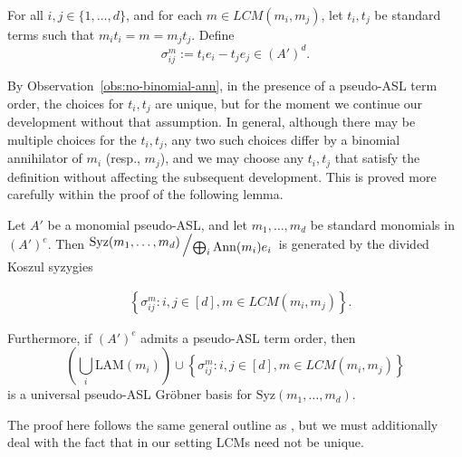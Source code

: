 \documentclass[11pt,reqno]{amsart}
\newcommand{\suchthat}{:}
\newcommand{\bigslant}[2]{{\raisebox{.2em}{$#1$}\left/\raisebox{-.2em}{$#2$}\right.}}
\DeclareMathOperator{\Ann}{Ann}
\newcommand{\Syz}{\text{Syz}}
\newcommand{\LAM}{\ensuremath{\text{LAM}}}
\theoremstyle{definition}
\numberwithin{equation}{section}
\begin{document}
\begin{definition} \label{def:koszul}
For all $i,j \in \{1,\dotsc,d\}$, and for each $m \in LCM(m_i, m_j)$, let $t_i,t_j$ be standard terms such that $m_i t_i = m = m_j t_j$. Define
\[
\sigma^m_{ij} := t_i e_i - t_j e_j \in (A')^d.
\]
\end{definition}

By Observation~\ref{obs:no-binomial-ann}, in the presence of a pseudo-ASL term order, the choices for $t_i,t_j$ are unique, but for the moment we continue our development without that assumption.
In general, although there may be multiple choices for the $t_i,t_j$, any two such choices differ by a binomial annihilator of $m_i$ (resp., $m_j$), and we may choose any $t_i, t_j$ that satisfy the definition without affecting the subsequent development. This is proved more carefully within the proof of the following lemma. 

\begin{lemma} \label{lem:syz_monomial}
Let $A'$ be a monomial pseudo-ASL, and let $m_1, \dotsc, m_d$ be standard monomials in $(A')^e$. Then $\bigslant{\Syz(m_1, \dotsc, m_d)}{\bigoplus_i \Ann(m_i) e_i}$ is generated by the divided Koszul syzygies

\begin{align*}
& 
\left\{\sigma^m_{ij} \suchthat i,j \in [d], m \in LCM(m_i, m_j)\right\}. 
\end{align*}

Furthermore, if $(A')^e$ admits a pseudo-ASL term order, then 
\[
\left(\bigcup_i \LAM(m_i) \right) \cup \left\{\sigma^m_{ij} \suchthat i,j \in [d], m \in LCM(m_i, m_j)\right\}
\]
is a universal pseudo-ASL Gröbner basis for $\Syz(m_1, \dotsc, m_d)$.
\end{lemma}

The proof here follows the same general outline as \cite[Section~15.1]{eisenbud}, but we must additionally deal with the fact that in our setting LCMs need not be unique.
\end{document}
